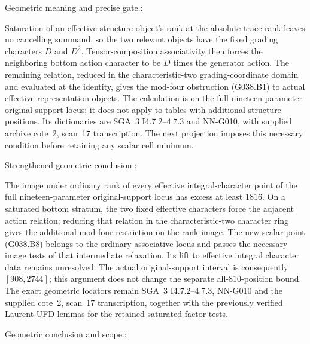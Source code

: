 \begin{geometricstatement}[NN-G038]

Geometric meaning and precise gate.:

Saturation of an effective structure object's rank at the absolute
trace rank leaves no cancelling summand, so the two relevant
objects have the fixed grading characters $D$ and $D^2$.
Tensor-composition associativity then forces the neighboring
bottom action character to be $D$ times the generator action.
The remaining relation, reduced in the characteristic-two
grading-coordinate domain and evaluated at the identity, gives
the mod-four obstruction (G038.B1) to actual effective
representation objects.  The calculation is on the full
nineteen-parameter original-support locus; it does not apply to
tables with additional structure positions.  Its dictionaries are
SGA~3 I4.7.2--4.7.3 and NN-G010, with supplied archive cote~2,
scan~17 transcription.  The next projection imposes this
necessary condition before retaining any scalar cell minimum.


Strengthened geometric conclusion.:

The image under ordinary rank of every effective integral-character
point of the full nineteen-parameter original-support locus has
excess at least $1816$.  On a saturated bottom stratum, the two
fixed effective characters force the adjacent action relation;
reducing that relation in the characteristic-two character ring
gives the additional mod-four restriction on the rank image.
The new scalar point (G038.B8) belongs to the ordinary associative
locus and passes the necessary image tests of that intermediate relaxation.  Its lift to
effective integral character data remains unresolved.  The actual
original-support interval is consequently $[908,2744]$; this
argument does not change the separate all-$810$-position bound.
The exact geometric locators remain SGA~3 I4.7.2--4.7.3,
NN-G010 and the supplied cote~2, scan~17 transcription, together
with the previously verified Laurent-UFD lemmas for the retained
saturated-factor tests.



Geometric conclusion and scope.:


\end{geometricstatement}
